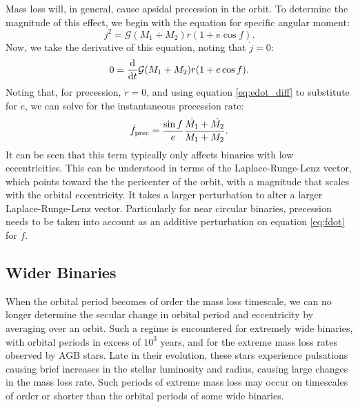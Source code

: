 \documentclass{emulateapj}
\begin{document}
Mass loss will, in general, cause apsidal precession in the orbit. To determine the magnitude of this effect, we begin with the equation for specific angular moment:
\begin{equation}
j^2 = \mathcal{G} (M_1 + M_2) r (1 + e \cos f).
\end{equation}
Now, we take the derivative of this equation, noting that $\dot{j}=0$:
\begin{equation}
0 = \frac{{\rm d}}{{\rm d}t} \mathcal{G} (M_1 + M_2) r (1 + e \cos f).
\end{equation}
Noting that, for precession, $\dot{r} = 0$, and using equation \ref{eq:edot_diff} to substitute for $\dot{e}$, we can solve for the instantaneous precession rate:
\begin{equation}
\dot{f}_{\rm prec} = \frac{\sin f}{e} \frac{\dot{M_1} + \dot{M_2}}{M_1 + M_2} \label{eq:prec}.
\end{equation}
It can be seen that this term typically only affects binaries with low eccentricities. This can be understood in terms of the Laplace-Runge-Lenz vector, which points toward the the pericenter of the orbit, with a magnitude that scales with the orbital eccentricity. It takes a larger perturbation to alter a larger Laplace-Runge-Lenz vector. Particularly for near circular binaries, precession needs to be taken into account as an additive perturbation on equation \ref{eq:fdot} for $\dot{f}$.

\subsection{Wider Binaries}
When the orbital period becomes of order the mass loss timescale, we can no longer determine the secular change in orbital period and eccentricity by averaging over an orbit. Such a regime is encountered for extremely wide binaries, with orbital periods in excess of $10^3$ years, and for the extreme mass loss rates observed by AGB stars. Late in their evolution, these stars experience pulsations  causing brief increases in the stellar luminosity and radius, causing large changes in the mass loss rate. Such periods of extreme mass loss may occur on timescales of order or shorter than the orbital periods of some wide binaries. 
\end{document}
